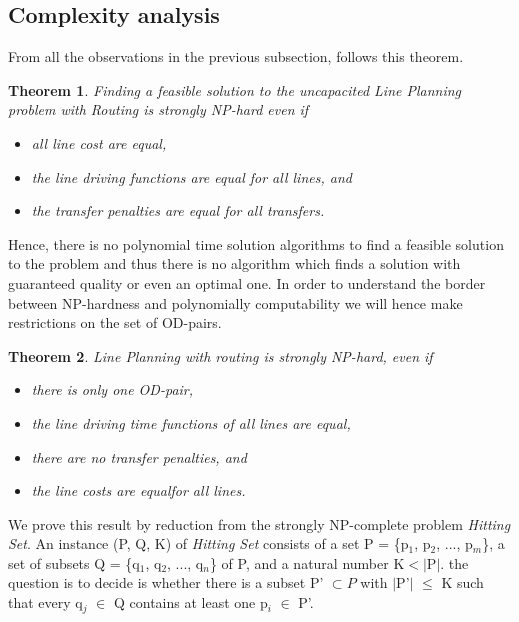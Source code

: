 \documentclass[
  twoside,
  11pt, a4paper,
  footinclude=true,
  headinclude=true,
  cleardoublepage=empty
]{book}
\newtheorem{theorem}{Theorem}[section]
\theoremstyle{definition}
\begin{document}
\subsection{Complexity analysis}
From all the observations in the previous subsection, follows this theorem.
\begin{theorem} Finding a feasible solution to the uncapacited Line Planning problem with Routing is strongly NP-hard even if
\begin{itemize} 
\item all line cost are equal,
\item the line driving functions are equal for all lines, and
\item the transfer penalties are equal for all transfers.
\end{itemize}
\end{theorem}
Hence, there is no polynomial time solution algorithms to find a feasible solution to the problem and thus there is no algorithm which finds a solution with guaranteed quality or even an optimal one. \newline
In order to understand the border between NP-hardness and polynomially computability we will hence make restrictions on the set of OD-pairs.
\begin{theorem} Line Planning with routing is strongly NP-hard, even if
\begin{itemize} 
\item there is only one OD-pair,
\item the line driving time functions of all lines are equal,
\item there are no transfer penalties, and
\item the line costs are equalfor all lines.
\end{itemize}
\end{theorem}
We prove this result by reduction from the strongly NP-complete problem \emph{Hitting Set}. \newline
An instance (P, Q, K) of \emph{Hitting Set} consists of a set P = \{p$_1$, p$_2$, ..., p$_m$\}, a set of subsets Q = \{q$_1$, q$_2$, ..., q$_n$\} of P, and a natural number K$<|$P$|$. the question is to decide is whether there is a subset P' $\subset P$ with $|$P'$|$ $\le$ K such that every q$_j$ $\in$ Q contains at least one p$_i$ $\in$ P'.
\end{document}
